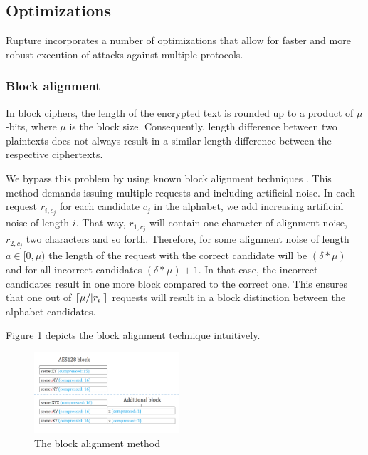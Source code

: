 \subsection{Optimizations}\label{subsec:optimizations}

Rupture incorporates a number of optimizations that allow for faster and more
robust execution of attacks against multiple protocols.

\subsubsection{Block alignment}\label{subsec:blockalign}
In block ciphers, the length of the encrypted text is rounded up to a product of
$\mu$-bits, where $\mu$ is the block size. Consequently, length difference
between two plaintexts does not always result in a similar length difference between the
respective ciphertexts.

We bypass this problem by using known block alignment techniques
\cite{moller2014poodle}. This method demands issuing multiple requests
and including artificial noise. In each request $r_{i, c_j}$
for each candidate $c_j$ in the alphabet, we add increasing artificial
noise of length $i$. That way, $r_{1, c_j}$ will contain one character of
alignment noise, $r_{2, c_j}$ two characters and so forth. Therefore, for some
alignment noise of length $a \in [0, \mu)$ the length of the request with the
correct candidate will be $(\delta*\mu)$ and for all incorrect candidates
$(\delta*\mu)+1$. In that case, the incorrect candidates result in one more
block compared to the correct one. This ensures that one out of $\lceil\mu /
|r_i|\rceil$ requests will result in a block distinction between the alphabet
candidates.

Figure \ref{fig:block_alignment} depicts the block alignment technique
intuitively.

   \begin{figure}[thpb]
      \centering
          \includegraphics[width=0.48\textwidth]{figures/block_alignment.png}
      \caption{The block alignment method}
      \label{fig:block_alignment}
   \end{figure}

